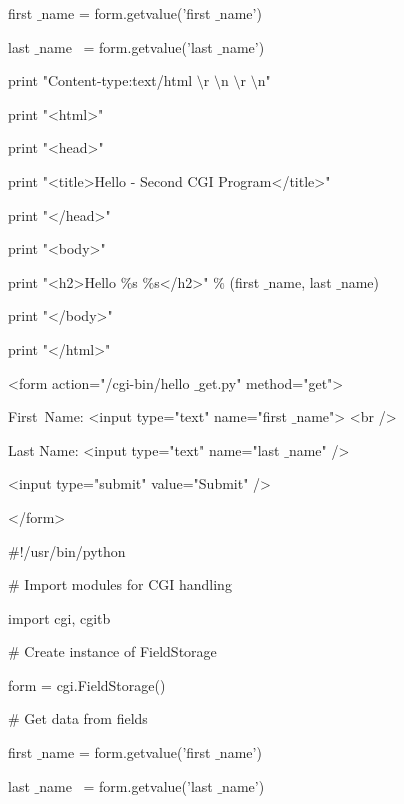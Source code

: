 \begin {enumerate}
\begin {enumerate}
\noindent
first $  \_  $name = form.getvalue('first $  \_  $name') \par
\noindent
last $  \_  $name~ = form.getvalue('last $  \_  $name') \par
\vspace{12pt}
\noindent
print "Content-type:text/html $  \setminus  $r $  \setminus  $n $  \setminus  $r $  \setminus  $n" \par
\noindent
print "<html>" \par
\noindent
print "<head>" \par
\noindent
print "<title>Hello - Second CGI Program</title>" \par
\noindent
print "</head>" \par
\noindent
print "<body>" \par
\noindent
print "<h2>Hello  $  \%  $s  $  \%  $s</h2>"  $  \%  $ (first $  \_  $name, last $  \_  $name) \par
\noindent
print "</body>" \par
\noindent
print "</html>" \par
\vspace{12pt}
\noindent
<form action="/cgi-bin/hello $  \_  $get.py" method="get"> \par
\noindent
First~Name: <input type="text" name="first $  \_  $name">  <br /> \par
\vspace{12pt}
\noindent
Last Name: <input type="text" name="last $  \_  $name" /> \par
\noindent
<input type="submit" value="Submit" /> \par
\noindent
</form> \par
\vspace{12pt}
\noindent
 $  \#  $!/usr/bin/python \par
\vspace{12pt}
\noindent
 $  \#  $ Import modules for CGI handling  \par
\noindent
import cgi, cgitb  \par
\vspace{12pt}
\noindent
 $  \#  $ Create instance of FieldStorage  \par
\noindent
form = cgi.FieldStorage()  \par
\vspace{12pt}
\noindent
 $  \#  $ Get data from fields \par
\noindent
first $  \_  $name = form.getvalue('first $  \_  $name') \par
\noindent
last $  \_  $name~ = form.getvalue('last $  \_  $name') \par

\end{enumerate}
\end{enumerate}
